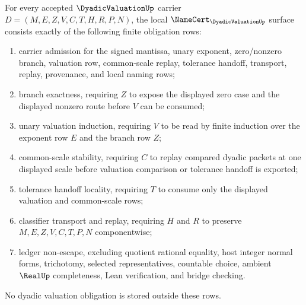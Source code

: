 \begin{theorem}
\label{thm:dyadic-valuation-namecert-obligations}
For every accepted $\DyadicValuationUp$ carrier $D=(M,E,Z,V,C,T,H,R,P,N)$, the local $\NameCert_{\DyadicValuationUp}$ surface consists exactly of the following finite obligation rows:
\begin{enumerate}
\item carrier admission for the signed mantissa, unary exponent, zero/nonzero branch, valuation row, common-scale replay, tolerance handoff, transport, replay, provenance, and local naming rows;
\item branch exactness, requiring $Z$ to expose the displayed zero case and the displayed nonzero route before $V$ can be consumed;
\item unary valuation induction, requiring $V$ to be read by finite induction over the exponent row $E$ and the branch row $Z$;
\item common-scale stability, requiring $C$ to replay compared dyadic packets at one displayed scale before valuation comparison or tolerance handoff is exported;
\item tolerance handoff locality, requiring $T$ to consume only the displayed valuation and common-scale rows;
\item classifier transport and replay, requiring $H$ and $R$ to preserve $M,E,Z,V,C,T,P,N$ componentwise;
\item ledger non-escape, excluding quotient rational equality, host integer normal forms, trichotomy, selected representatives, countable choice, ambient $\RealUp$ completeness, Lean verification, and bridge checking.
\end{enumerate}
No dyadic valuation obligation is stored outside these rows.
\end{theorem}

